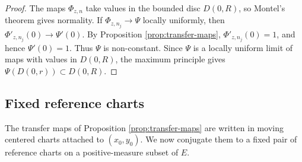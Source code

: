 \documentclass[11pt]{amsart}
\numberwithin{equation}{section}
\theoremstyle{plain}
\theoremstyle{definition}
\theoremstyle{remark}
\begin{document}
\begin{proof}
The maps $\Phi_{z,n}$ take values in the bounded disc $D(0,R)$, so
Montel's theorem gives normality. If
$\Phi_{z,n_j}\to\Psi$ locally uniformly, then
$
\Phi'_{z,n_j}(0)\to\Psi'(0)$.
By Proposition \ref{prop:transfer-maps},
$\Phi'_{z,n_j}(0)=1$, and hence $\Psi'(0)=1$.
Thus $\Psi$ is non-constant. Since $\Psi$ is a locally uniform limit
of maps with values in $D(0,R)$, the maximum principle gives
$\Psi(D(0,r))\subset D(0,R)$.
\end{proof}


\subsection{Fixed reference charts}
\label{subsec:fixed-reference-charts}
The transfer maps of Proposition \ref{prop:transfer-maps} are written
in moving centered charts attached to $(x_0,y_0)$. We now conjugate
them to a fixed pair of reference charts on a positive-measure subset
of $E$.
\end{document}
